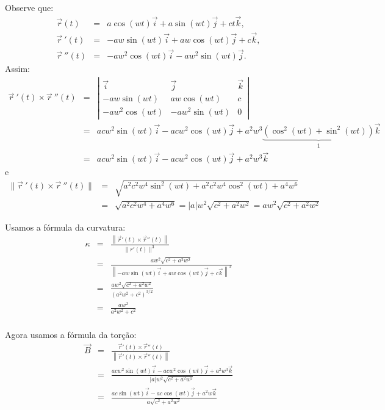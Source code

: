 \begin{resol}
 Observe que:
\begin{eqnarray*}
\vec{r}(t)&=&a\cos(wt)\vec{i}+a\sin(wt)\vec{j}+ct\vec{k},\\
\vec{r}~\!'(t)&=&-aw\sin(wt)\vec{i}+aw\cos(wt)\vec{j}+c\vec{k},\\
\vec{r}~\!''(t)&=&-aw^2\cos(wt)\vec{i}-aw^2\sin(wt)\vec{j}.
\end{eqnarray*}
Assim:
\begin{eqnarray*}
\vec{r}~\!'(t)\times \vec{r}~\!''(t)&=&\left|
\begin{array}{ccc}
\vec{i}&\vec{j}&\vec{k}\\[0.5cm]
-aw\sin(wt)&aw\cos(wt)&c\\[0.5cm]
-aw^2\cos(wt)&-aw^2\sin(wt)&0
\end{array}
\right|\\
&=&
acw^2\sin(wt)\vec{i}-acw^2\cos(wt)\vec{j}+a^2w^3\underbrace{\left(\cos^2(wt)+\sin^2(wt)\right)}_{1}\vec{k}\\
&=&acw^2\sin(wt)\vec{i}-acw^2\cos(wt)\vec{j}+a^2w^3\vec{k}
\end{eqnarray*}
e
\begin{eqnarray*}
\|\vec{r}~\!'(t)\times \vec{r}~\!''(t)\|&=&\sqrt{a^2c^2w^4\sin^2(wt)+a^2c^2w^4\cos^2(wt)+a^4w^6}\\
&=&\sqrt{a^2c^2w^4+a^4w^6}=|a|w^2\sqrt{c^2+a^2w^2}=aw^2\sqrt{c^2+a^2w^2}
\end{eqnarray*}

Usamos a fórmula da curvatura:
\begin{eqnarray*}\kappa &=& \frac{\left\|\vec{r}'(t)\times \vec{r}''(t)\right\|}{\|r'(t)\|^3}\\
&=&\frac{aw^2\sqrt{c^2+a^2w^2}}{\left\|-aw\sin(wt)\vec{i}+aw\cos(wt)\vec{j}+c\vec{k}\right\|^3}\\
&=&\frac{aw^2\sqrt{c^2+a^2w^2}}{\left(a^2w^2+c^2\right)^{3/2}}\\
&=&\frac{aw^2}{{a^2w^2+c^2}}\\
\end{eqnarray*}


Agora usamos a fórmula da torção:
\begin{eqnarray*}\vec{B}&=&\frac{\vec{r}'(t)\times \vec{r}''(t)}{\left\|\vec{r}'(t)\times \vec{r}''(t)\right\|}\\
&=&\frac{acw^2\sin(wt)\vec{i}-acw^2\cos(wt)\vec{j}+a^2w^3\vec{k}}{|a|w^2\sqrt{c^2+a^2w^2}}\\
&=&\frac{ac\sin(wt)\vec{i}-ac\cos(wt)\vec{j}+a^2w\vec{k}}{a\sqrt{c^2+a^2w^2}}
\end{eqnarray*}


\end{resol}
